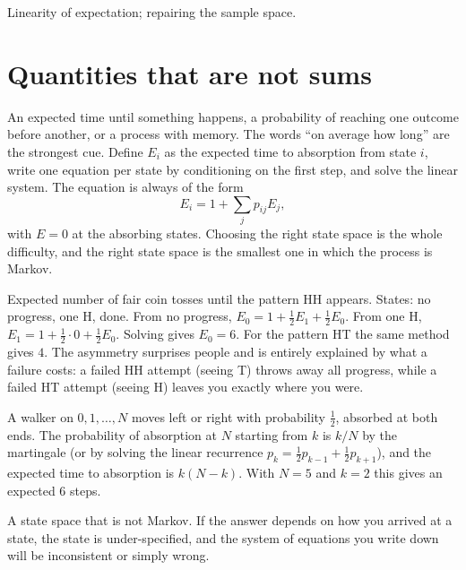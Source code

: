 \begin{seealsob}Linearity of expectation; repairing the sample space.\end{seealsob}

\section{Quantities that are not sums}

\cue An expected time until something happens, a probability of reaching one outcome before another, or a process with memory. The words ``on average how long'' are the strongest cue.
\method Define $E_{i}$ as the expected time to absorption from state $i$, write one equation per state by conditioning on the first step, and solve the linear system. The equation is always of the form
\[
E_{i}=1+\sum_{j}p_{ij}E_{j},
\]
with $E=0$ at the absorbing states. Choosing the right state space is the whole difficulty, and the right state space is the smallest one in which the process is Markov.

\begin{worked}
Expected number of fair coin tosses until the pattern HH appears. States: no progress, one H, done. From no progress, $E_{0}=1+\tfrac12E_{1}+\tfrac12E_{0}$. From one H, $E_{1}=1+\tfrac12\cdot0+\tfrac12E_{0}$. Solving gives $E_{0}=6$. For the pattern HT the same method gives $4$. The asymmetry surprises people and is entirely explained by what a failure costs: a failed HH attempt (seeing T) throws away all progress, while a failed HT attempt (seeing H) leaves you exactly where you were.
\end{worked}

\begin{worked}
A walker on $0,1,\ldots,N$ moves left or right with probability $\tfrac12$, absorbed at both ends. The probability of absorption at $N$ starting from $k$ is $k/N$ by the martingale (or by solving the linear recurrence $p_{k}=\tfrac12p_{k-1}+\tfrac12p_{k+1}$), and the expected time to absorption is $k(N-k)$. With $N=5$ and $k=2$ this gives an expected $6$ steps.
\end{worked}

\begin{trap}
A state space that is not Markov. If the answer depends on how you arrived at a state, the state is under-specified, and the system of equations you write down will be inconsistent or simply wrong.
\end{trap}

